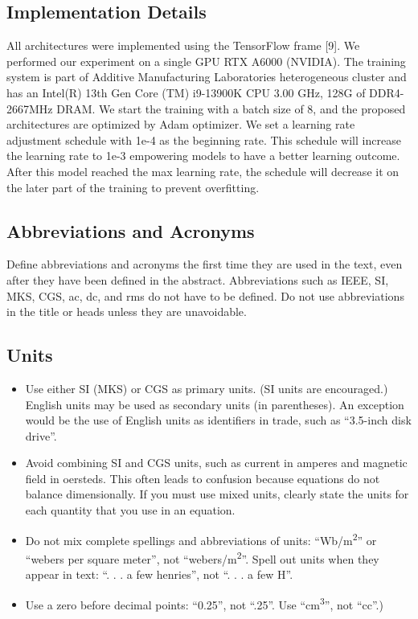 \documentclass[conference]{IEEEtran}
\begin{document}
\subsection{Implementation Details}
All architectures were implemented using the TensorFlow frame [9]. We performed our experiment on a single GPU RTX A6000 (NVIDIA). The training system is part of Additive Manufacturing Laboratories heterogeneous cluster and has an Intel(R) 13th Gen Core (TM) i9-13900K CPU 3.00 GHz, 128G of DDR4-2667MHz DRAM. We start the training with a batch size of 8, and the proposed architectures are optimized by Adam optimizer. We set a learning rate adjustment schedule with 1e-4 as the beginning rate. This schedule will increase the learning rate to 1e-3 empowering models to have a better learning outcome. After this model reached the max learning rate, the schedule will decrease it on the later part of the training to prevent overfitting.
\newpage
\subsection{Abbreviations and Acronyms}\label{AA}
Define abbreviations and acronyms the first time they are used in the text, 
even after they have been defined in the abstract. Abbreviations such as 
IEEE, SI, MKS, CGS, ac, dc, and rms do not have to be defined. Do not use 
abbreviations in the title or heads unless they are unavoidable.

\subsection{Units}
\begin{itemize}
\item Use either SI (MKS) or CGS as primary units. (SI units are encouraged.) English units may be used as secondary units (in parentheses). An exception would be the use of English units as identifiers in trade, such as ``3.5-inch disk drive''.
\item Avoid combining SI and CGS units, such as current in amperes and magnetic field in oersteds. This often leads to confusion because equations do not balance dimensionally. If you must use mixed units, clearly state the units for each quantity that you use in an equation.
\item Do not mix complete spellings and abbreviations of units: ``Wb/m\textsuperscript{2}'' or ``webers per square meter'', not ``webers/m\textsuperscript{2}''. Spell out units when they appear in text: ``. . . a few henries'', not ``. . . a few H''.
\item Use a zero before decimal points: ``0.25'', not ``.25''. Use ``cm\textsuperscript{3}'', not ``cc''.)
\end{itemize}
\end{document}
